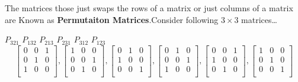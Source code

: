 \documentclass[a4paper,11pt]{article}
\numberwithin{equation}{section}
\begin{document}
\begin{itemize}
    The matrices those just swaps the rows of a matrix or just columns of a matrix are Known as \textbf{Permutaiton Matrices}.Consider following $3 \times 3$ matrices\dots
    \begin{center}
        \hspace{0.2cm} $P_{321}$ \hspace{1.1cm} $P_{132}$ \hspace{1.1cm} $P_{213}$ \hspace{1.1cm} $P_{231}$ \hspace{1.1cm} $P_{312}$ \hspace{1.1cm} $P_{123}$ \hspace{1.1cm}
        \[
        \begin{bmatrix}
            0 & 0 & 1\\
            0 & 1 & 0\\
            1 & 0 & 0\\
        \end{bmatrix},
        \begin{bmatrix}
            1 & 0 & 0\\
            0 & 0 & 1\\
            0 & 1 & 0\\
        \end{bmatrix},
        \begin{bmatrix}
            0 & 1 & 0\\
            1 & 0 & 0\\
            0 & 0 & 1\\
        \end{bmatrix},
        \begin{bmatrix}
            0 & 1 & 0\\
            0 & 0 & 1\\
            1 & 0 & 0\\
        \end{bmatrix},
        \begin{bmatrix}
            0 & 0 & 1\\
            1 & 0 & 0\\
            0 & 1 & 0\\
        \end{bmatrix},
        \begin{bmatrix}
            1 & 0 & 0\\
            0 & 1 & 0\\
            0 & 0 & 1\\
        \end{bmatrix}
        \]
    \end{center}


\end{itemize}
\end{document}
